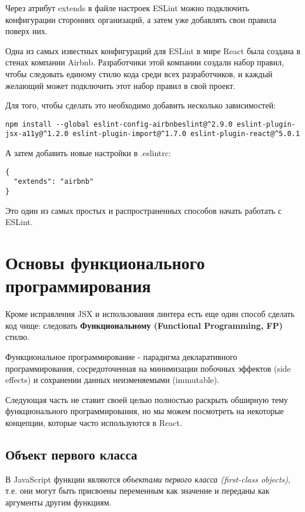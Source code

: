 Через атрибут extends в файле настроек ESLint можно подключить конфигурации сторонних организаций, а затем уже добавлять свои правила поверх них.

Одна из самых известных конфигураций для ESLint в мире React была создана в стенах компании Airbnb. Разработчики этой компании создали набор правил, чтобы следовать единому стилю кода среди всех разработчиков, и каждый желающий может подключить этот набор правил в свой проект.

Для того, чтобы сделать это необходимо добавить несколько зависимостей:

\begin{lstlisting}
npm install --global eslint-config-airbnbeslint@^2.9.0 eslint-plugin-jsx-a11y@^1.2.0 eslint-plugin-import@^1.7.0 eslint-plugin-react@^5.0.1
\end{lstlisting}

А затем добавить новые настройки в .eslintrc:

\begin{lstlisting}
{
  "extends": "airbnb"
}
\end{lstlisting}

Это один из самых простых и распространенных способов начать работать с ESLint.


\section{Основы функционального программирования}

Кроме исправления JSX и использования линтера есть еще один способ сделать код чище: следовать \textbf{Функциональному (Functional Programming, FP)} стилю.

Функциональное программирование - парадигма декларативного программирования, сосредоточенная на минимизации побочных эффектов (side effects) и сохранении данных неизменяемыми (immutable).

Следующая часть не ставит своей целью полностью раскрыть обширную тему функционального программирования, но мы можем посмотреть на некоторые концепции, которые часто используются в React. 

\subsection{Объект первого класса}

В JavaScript функции являются \textit{объектами первого класса (first-class objects)}, т.е. они могут быть присвоены переменным как значение и переданы как аргументы другим функциям.

